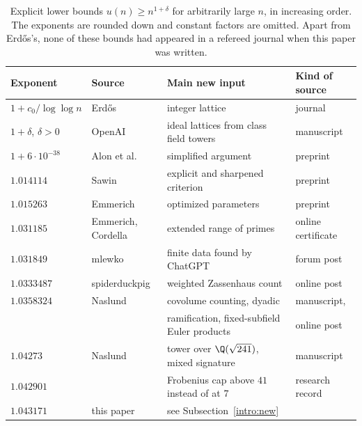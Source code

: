 \begin{table}[htbp]
\centering
\caption{Explicit lower bounds $u(n)\ge n^{1+\delta}$ for arbitrarily
large $n$, in increasing order. The exponents are rounded down and
constant factors are omitted. Apart from Erd\H{o}s's, none of these
bounds had appeared in a refereed journal when this paper was written.}
\label{intro:table-bounds}
\small
\begin{tabular}{@{}llll@{}}
\toprule
Exponent & Source & Main new input & Kind of source\\
\midrule
$1+c_0/\log\log n$ & Erd\H{o}s \cite{Erdos1946} & integer lattice & journal\\
$1+\delta$, $\delta>0$ & OpenAI \cite{OpenAI2026} & ideal lattices from class field towers & manuscript\\
$1+6\cdot10^{-38}$ & Alon et al.\ \cite{Alon2026} & simplified argument & preprint\\
$1.014114$ & Sawin \cite{Sawin2026} & explicit and sharpened criterion & preprint\\
$1.015263$ & Emmerich \cite{Emmerich2026} & optimized parameters & preprint\\
$1.031185$ & Emmerich, Cordella \cite{EmmerichCordella2026} & extended range of primes & online certificate\\
$1.031849$ & mlewko \cite{ErdosProblems90} & finite data found by ChatGPT & forum post\\
$1.0333487$ & spiderduckpig \cite{SpiderduckpigMO2026} & weighted Zassenhaus count & online post\\
$1.0358324$ & Naslund \cite{Naslund0358,NaslundMO2026} & covolume counting, dyadic & manuscript,\\
 & & ramification, fixed-subfield Euler products & online post\\
$1.04273$ & Naslund \cite{Naslund04273} & tower over $\Q(\sqrt{241})$, mixed signature & manuscript\\
$1.042901$ & \cite{NaslundCode4317} & Frobenius cap above $41$ instead of at $7$ & research record\\
$1.043171$ & this paper & see Subsection~\ref{intro:new} & \\
\bottomrule
\end{tabular}
\end{table}

